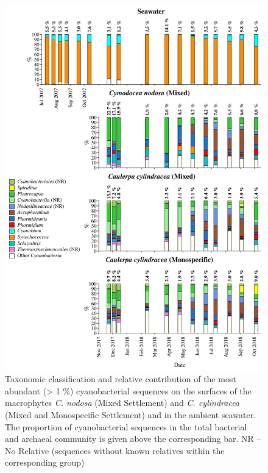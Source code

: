 \documentclass[12pt,]{article}
\begin{document}
\begin{figure}[H]

{\centering \includegraphics[width=0.85\linewidth]{../results/figures/cyanobacteria_bar_plot} 

}

\caption{Taxonomic classification and relative contribution of the most abundant (> 1 \si{\percent}) cyanobacterial sequences on the surfaces of the macrophytes \textit{C. nodosa} (Mixed Settlement) and \textit{C. cylindracea} (Mixed and Monospecific Settlement) and in the ambient seawater. The proportion of cyanobacterial sequences in the total bacterial and archaeal community is given above the corresponding bar. NR -- No Relative (sequences without known relatives within the corresponding group)\label{cyano}}\label{fig:unnamed-chunk-5}
\end{figure}
\end{document}

